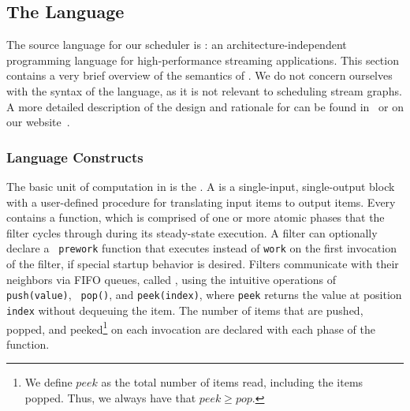 \subsection{The {\StreamIt} Language}
\label{sec:streamit}

The source language for our scheduler is {\StreamIt}: an
architecture-independent programming language for high-performance
streaming applications.  This section contains a very brief overview
of the semantics of {\StreamIt}.  We do not concern ourselves with the
syntax of the language, as it is not relevant to scheduling stream
graphs. A more detailed description of the design and rationale for
{\StreamIt} can be found in~\cite{thies02streamit} or on our
website~\cite{streamitweb}.

\subsubsection{Language Constructs}

The basic unit of computation in {\StreamIt} is the {\filter}. A
{\filter} is a single-input, single-output block with a user-defined
procedure for translating input items to output items.  Every
{\filter} contains a {\work} function, which is comprised of one or
more atomic phases that the filter cycles through during its
steady-state execution. A filter can optionally declare a {\tt
prework} function that executes instead of {\tt work} on the first
invocation of the filter, if special startup behavior is desired.
Filters communicate with their neighbors via FIFO queues, called
{\Channels}, using the intuitive operations of {\tt push(value)}, {\tt
pop()}, and {\tt peek(index)}, where {\tt peek} returns the value at
position {\tt index} without dequeuing the item.  The number of items
that are pushed, popped, and peeked\footnote{{\small We define $peek$
as the total number of items read, including the items popped.  Thus,
we always have that $peek \ge pop$.}} on each invocation are declared
with each phase of the {\work} function.


